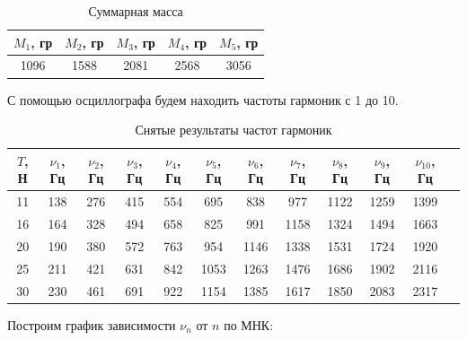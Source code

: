\documentclass[a4paper, 12pt]{article}
\begin{document}
    \newpage

     \begin{table}[!h]
        \begin{center}
		\begin{tabular}{|c|c|c|c|c|}
			\hline
			$M_1$, гр & $M_2$, гр & $M_3$, гр & $M_4$, гр & $M_5$, гр\\
			\hline
			  1096 & 1588 & 2081 & 2568 & 3056\\
			\hline 
		\end{tabular}
  
	    \caption{Суммарная масса}
        \end{center}
    \end{table}
    \begin{center}
        С помощью осциллографа будем находить частоты гармоник с 1 до 10. 
    \end{center}
	\begin{table}[!h]
		\begin{center}
			\begin{tabular}{|c|c|c|c|c|c|c|c|c|c|c|c|}
				\hline
				$T$, Н& $\nu_1$, Гц &$\nu_2$, Гц& $\nu_3$, Гц& $\nu_4$, Гц& $\nu_5$, Гц& $\nu_6$, Гц &$\nu_7$, Гц& $\nu_8$, Гц& $\nu_9$, Гц& $\nu_{10}$, Гц\\
				\hline
				11 & 138 & 276 & 415 & 554 & 695 & 838 & 977 & 1122 & 1259 & 1399\\ 
				\hline
				16 & 164 & 328 & 494 & 658 & 825 & 991 & 1158 & 1324 & 1494 & 1663\\ 
				\hline
				20 & 190 & 380 & 572 & 763 & 954 & 1146 & 1338 & 1531 & 1724 & 1920\\
				\hline
				25 & 211 & 421 & 631 & 842 & 1053 & 1263 & 1476 & 1686 & 1902 & 2116\\ 
				\hline
				30 & 230 & 461 & 691 & 922 & 1154 & 1385 & 1617 & 1850 & 2083 & 2317\\ 
				\hline
			\end{tabular}
		\caption{Снятые результаты частот гармоник}
		\end{center}
	\end{table}
    \begin{center}
        Построим график зависимости $\nu_n$ от $n$ по МНК:
    \end{center}
    
\end{document}
